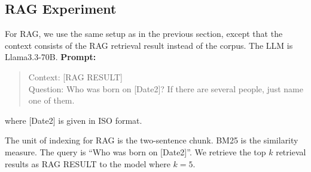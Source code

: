\documentclass[11pt]{article}
\begin{document}





\subsection{RAG Experiment}

For RAG, we use the same setup as in the previous section,
except that the context consists of the RAG retrieval result
instead of the corpus. The LLM is Llama3.3-70B.
\textbf{Prompt:}
\begin{quote}
Context: [RAG RESULT]\\
Question:  Who was born on [Date2]? If there are several
people, just name one of them.
\end{quote}
where [Date2] is given in ISO format.


The unit of indexing for RAG is the
two-sentence chunk.
BM25 is the
similarity measure. The query is ``Who was born on
[Date2]''. We retrieve the top $k$ retrieval results as RAG
RESULT to the model where $k=5$.

\end{document}
